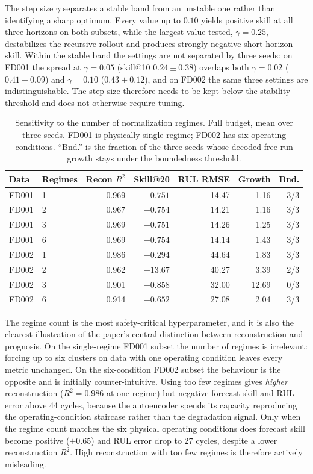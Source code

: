 \documentclass[a4paper,fleqn]{cas-sc}
\newcommand{\tinytable}{\scriptsize}
\newcommand{\verytighttables}{%
  \setlength{\tabcolsep}{3.5pt}%
  \renewcommand{\arraystretch}{1.05}%
}
\begin{document}
The step size $\gamma$ separates a stable band from an unstable one rather than
identifying a sharp optimum. Every value up to $0.10$ yields positive skill at
all three horizons on both subsets, while the largest value tested,
$\gamma{=}0.25$, destabilizes the recursive rollout and produces strongly
negative short-horizon skill. Within the stable band the settings are not
separated by three seeds: on FD001 the spread at $\gamma{=}0.05$ (skill@10
$0.24\pm0.38$) overlaps both $\gamma{=}0.02$ ($0.41\pm0.09$) and
$\gamma{=}0.10$ ($0.43\pm0.12$), and on FD002 the same three settings are
indistinguishable. The step size therefore needs to be kept below the stability
threshold and does not otherwise require tuning.

\begin{table}[t]
\centering
\caption{Sensitivity to the number of normalization regimes. Full budget, mean
over three seeds. FD001 is physically single-regime; FD002 has six operating
conditions. ``Bnd.'' is the fraction of the three seeds whose decoded free-run
growth stays under the boundedness threshold.}
\label{tab:sens-regimes}
\tinytable
\verytighttables
\begin{tabular}{@{}llrrrrr@{}}
\toprule
Data & Regimes & Recon $R^2$ & Skill@20 & RUL RMSE & Growth & Bnd. \\
\midrule
FD001 & 1 & 0.969 & $+0.751$ & 14.47 & 1.16 & 3/3 \\
FD001 & 2 & 0.967 & $+0.754$ & 14.21 & 1.16 & 3/3 \\
FD001 & 3 & 0.969 & $+0.751$ & 14.26 & 1.25 & 3/3 \\
FD001 & 6 & 0.969 & $+0.754$ & 14.14 & 1.43 & 3/3 \\
FD002 & 1 & 0.986 & $-0.294$ & 44.64 & 1.83 & 3/3 \\
FD002 & 2 & 0.962 & $-13.67$ & 40.27 & 3.39 & 2/3 \\
FD002 & 3 & 0.901 & $-0.858$ & 32.00 & 12.69 & 0/3 \\
FD002 & 6 & 0.914 & $+0.652$ & 27.08 & 2.04 & 3/3 \\
\bottomrule
\end{tabular}
\end{table}

The regime count is the most safety-critical hyperparameter, and it is also the
clearest illustration of the paper's central distinction between reconstruction
and prognosis. On the single-regime FD001 subset the number of regimes is
irrelevant: forcing up to six clusters on data with one operating condition
leaves every metric unchanged. On the six-condition FD002 subset the behaviour
is the opposite and is initially counter-intuitive. Using too few regimes gives
\emph{higher} reconstruction ($R^2{=}0.986$ at one regime) but negative
forecast skill and RUL error above 44 cycles, because the autoencoder spends
its capacity reproducing the operating-condition staircase rather than the
degradation signal. Only when the regime count matches the six physical
operating conditions does forecast skill become positive ($+0.65$) and RUL
error drop to 27 cycles, despite a lower reconstruction $R^2$. High
reconstruction with too few regimes is therefore actively misleading.
\end{document}
